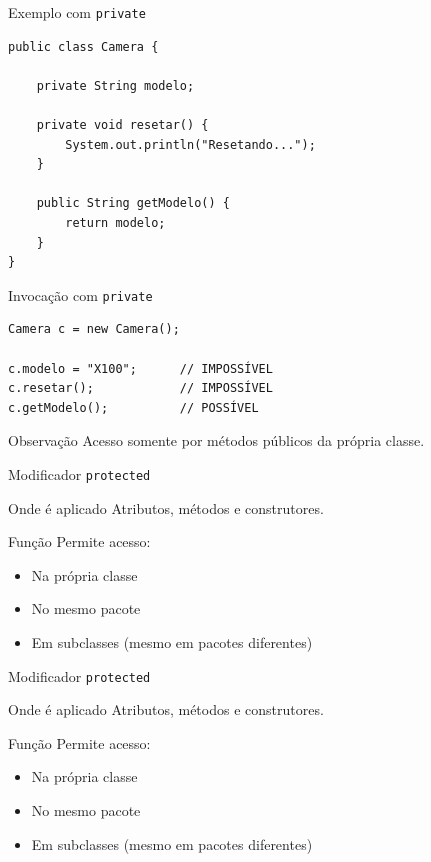 \documentclass[9pt]{beamer}
\begin{document}
\begin{frame}[fragile]{Exemplo com \texttt{private}}

\begin{verbatim}
public class Camera {

    private String modelo;

    private void resetar() {
        System.out.println("Resetando...");
    }

    public String getModelo() {
        return modelo;
    }
}
\end{verbatim}

\end{frame}
\begin{frame}[fragile]{Invocação com \texttt{private}}

\begin{verbatim}
Camera c = new Camera();

c.modelo = "X100";      // IMPOSSÍVEL
c.resetar();            // IMPOSSÍVEL
c.getModelo();          // POSSÍVEL
\end{verbatim}

\begin{block}{Observação}
Acesso somente por métodos públicos da própria classe.
\end{block}

\end{frame}
\begin{frame}{Modificador \texttt{protected}}

\begin{block}{Onde é aplicado}
Atributos, métodos e construtores.
\end{block}

\begin{block}{Função}
Permite acesso:
\begin{itemize}
\item Na própria classe
\item No mesmo pacote
\item Em subclasses (mesmo em pacotes diferentes)
\end{itemize}
\end{block}

\end{frame}
\begin{frame}{Modificador \texttt{protected}}

\begin{block}{Onde é aplicado}
Atributos, métodos e construtores.
\end{block}

\begin{block}{Função}
Permite acesso:
\begin{itemize}
\item Na própria classe
\item No mesmo pacote
\item Em subclasses (mesmo em pacotes diferentes)
\end{itemize}
\end{block}

\end{frame}
\end{document}
